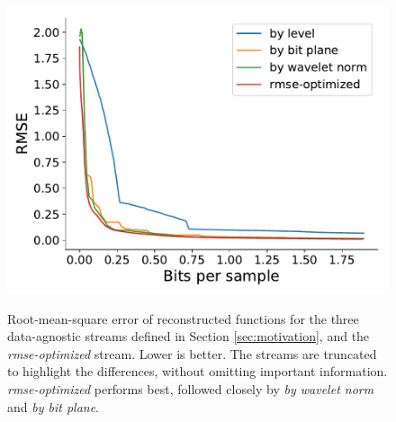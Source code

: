 \begin{figure}
 	{\includegraphics[width=0.48\linewidth]{img/rmse/rmse-optimized-velocityz.pdf}}
 	\caption{Root-mean-square error of reconstructed functions for the three data-agnostic streams
 	defined in Section \ref{sec:motivation}, and the \emph{rmse-optimized} stream. Lower is better.
 	The streams are truncated to highlight the differences, without omitting important information.
 	\emph{rmse-optimized} performs best, followed closely by \emph{by wavelet norm} and \emph{by bit
 	plane}.}
 	\label{fig:rmse-optimized}
\end{figure}




